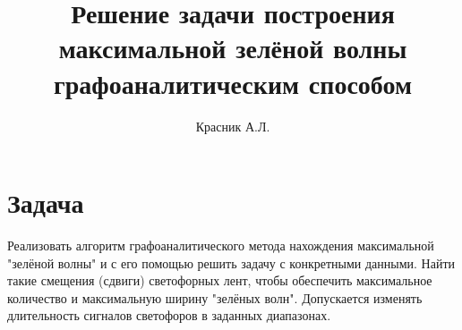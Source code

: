 \documentclass[12pt]{article}
\title{Решение задачи построения максимальной зелёной волны графоаналитическим способом}
\author{Красник А.Л.}
\begin{document}
\maketitle
\newpage
\section{Задача}
Реализовать алгоритм графоаналитического метода нахождения максимальной "зелёной волны" и с его помощью решить задачу с конкретными данными. Найти такие смещения (сдвиги) светофорных лент, чтобы обеспечить максимальное количество и максимальную ширину "зелёных волн". Допускается изменять длительность сигналов светофоров в заданных диапазонах.
\end{document}

